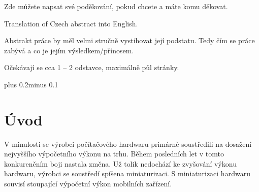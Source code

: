 \documentclass[11pt,twoside,a4paper]{book}
\begin{document}
\coverpagestarts

\acknowledgements
\noindent
Zde můžete napsat své poděkování, pokud chcete a máte komu děkovat.




\abstractpage
Translation of Czech abstract into English.


\baselineskip

\noindent
Abstrakt práce by měl velmi stručně vystihovat její podstatu. Tedy čím se práce zabývá a co je jejím výsledkem/přínosem.

\noindent
Očekávají se cca 1 -- 2 odstavce, maximálně půl stránky.

\tableofcontents


\listoffigures


\listoftables


\mainbodystarts
\normalfont
{}\baselineskip plus 0.2\baselineskip minus 0.1\baselineskip



% 
% 

\chapter{Úvod}
V minulosti se výrobci počítačového hardwaru primárně soustředili na dosažení nejvyššího výpočetního výkonu na trhu. Během posledních let v tomto konkurenčním boji nastala změna. Už tolik nedochází ke zvyšování výkonu hardwaru, výrobci se soustředí spíše\linebreak na miniaturizaci. S miniaturizaci hardwaru souvisí stoupající výpočetní výkon mobilních zařízení. 
\end{document}
